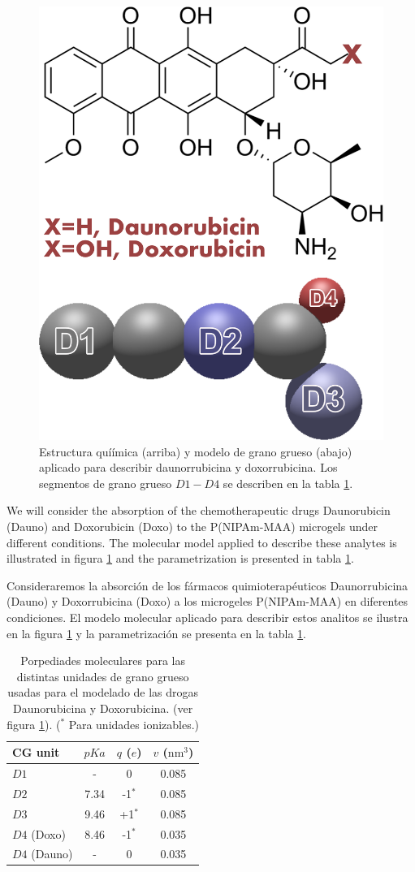 \begin{figure}[!tb]
\centering
\includegraphics[width=0.35\linewidth]{Figures/graph-gel/dauno-doxo.png}
\caption{Estructura quí\'imica (arriba) y modelo de grano grueso (abajo) aplicado para describir daunorrubicina y doxorrubicina.
	Los segmentos de grano grueso $D1-D4$ se describen en la tabla \ref{table:drugs}.}
\label{fig:dauno-doxo}
\end{figure}



We will consider the absorption of the chemotherapeutic drugs Daunorubicin (Dauno) and Doxorubicin (Doxo) to the P(NIPAm-MAA) microgels under different conditions.
The molecular model applied to describe these analytes is illustrated in figura  \ref{fig:dauno-doxo} and the parametrization is presented in tabla \ref{table:drugs}.\addcite[PerezChavez2020]

Consideraremos la absorci\'on de los f\'armacos quimioterap\'euticos Daunorrubicina (Dauno) y Doxorrubicina (Doxo) a los microgeles P(NIPAm-MAA) en diferentes condiciones.
El modelo molecular aplicado para describir estos analitos se ilustra en la figura \ref{fig:dauno-doxo} y la parametrizaci\'on se presenta en la tabla \ref{table:drugs}.\addcite[PerezChavez2020]

\begin{table}
\centering
\begin{tabular}{|lccc|}
    \hline
    {CG unit} & {$pKa$} & {$q$ ($e$)} & {$v$ ($\text{nm}^3$)} \\
      \hline
$D1$ & - & 0 & 0.085\\
$D2$ & 7.34 & -1$^\ast$ & 0.085\\
$D3$ & 9.46 & +1$^\ast$ & 0.085\\ 
$D4$ (Doxo) & 8.46 & -1$^\ast$ & 0.035\\
$D4$ (Dauno) & - & 0 & 0.035 \\
    \hline
  \end{tabular}
 \caption{Porpediades moleculares para las distintas unidades de grano grueso usadas para el modelado de las drogas Daunorubicina y Doxorubicina. (ver figura \ref{fig:dauno-doxo}).
\footnotesize ($^\ast$ Para unidades ionizables.)}
\label{table:drugs} 
\end{table}




